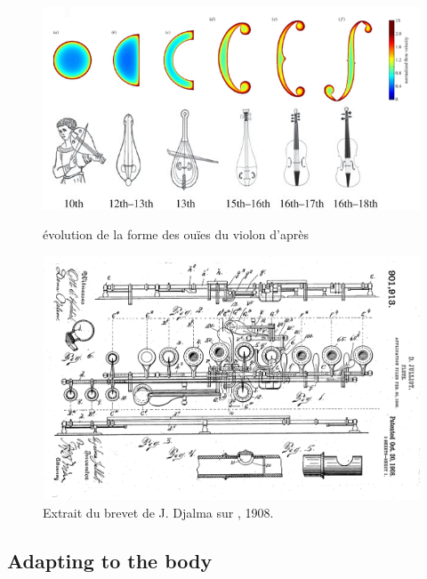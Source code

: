 \begin{figure}
	\captionsetup{format=plain}%
	\centering
	\begin{minipage}[t]{0.48\textwidth}
		\includegraphics[width=\linewidth]{gfx/06_visual_representation/f-hole.png}
		\caption{évolution de la forme des ouïes du violon d'après \cite{nia_evolution_2015}}
		\label{fig:visual_representation:fhole}
	\end{minipage}
	\hspace{.02\linewidth}
	\begin{minipage}[t]{0.48\textwidth}
	    \includegraphics[width=\linewidth]{gfx/06_visual_representation/Julliot_patent.png}
		\caption{Extrait du brevet de J. Djalma sur , 1908.}
		\label{fig:visual_representation:boehm}
	\end{minipage}
\end{figure}

\subsection{Adapting to the body}


